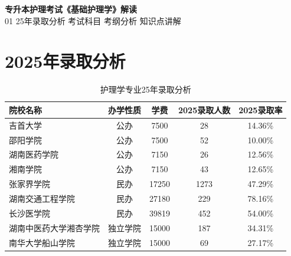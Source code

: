 \documentclass[11pt, a4paper]{ctexart}
\begin{document}
\begin{center}
	{\Huge \bfseries 专升本护理考试《基础护理学》解读} \\
	\vspace{0.3cm}
	{\large 01 25年录取分析  考试科目  考纲分析  知识点讲解}
\end{center}

\tableofcontents
\newpage

\section{2025年录取分析}
\begin{table}[htbp]
	\centering
	\caption{护理学专业25年录取分析}
	\label{tab:admission}
	\small
	\begin{tabular}{|l|c|c|c|c|}
		\hline
		\textbf{院校名称} & \textbf{办学性质} & \textbf{学费} & \textbf{2025录取人数} & \textbf{2025录取率} \\
		\hline
		吉首大学          & 公办            & 7500        & 28                & 14.36\%          \\
		邵阳学院          & 公办            & 7500        & 52                & 10.00\%          \\
		湖南医药学院        & 公办            & 7150        & 26                & 12.56\%          \\
		湘南学院          & 公办            & 7150        & 43                & 12.65\%          \\
		张家界学院         & 民办            & 17250       & 1273              & 47.29\%          \\
		湖南交通工程学院      & 民办            & 27180       & 229               & 78.16\%          \\
		长沙医学院         & 民办            & 39819       & 452               & 54.00\%          \\
		湖南中医药大学湘杏学院   & 独立学院          & 15000       & 187               & 34.31\%          \\
		南华大学船山学院      & 独立学院          & 15000       & 69                & 27.17\%          \\
		\hline
	\end{tabular}
\end{table}
\end{document}
